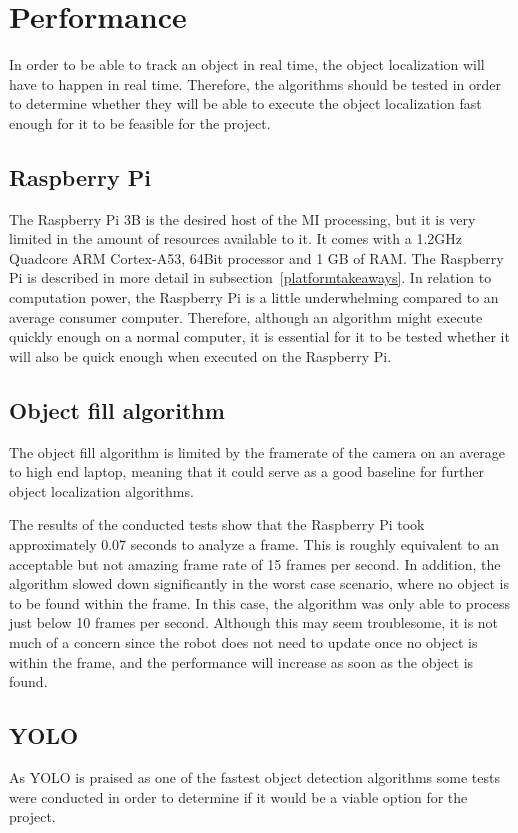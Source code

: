 \section{Performance}
In order to be able to track an object in real time, the object localization will have to happen in real time.
Therefore, the algorithms should be tested in order to determine whether they will be able to execute the object localization fast enough for it to be feasible for the project.

\subsection{Raspberry Pi}
The Raspberry Pi 3B is the desired host of the MI processing, but it is very limited in the amount of resources available to it.
It comes with a 1.2GHz Quadcore ARM Cortex-A53, 64Bit processor and 1 GB of RAM.
The Raspberry Pi is described in more detail in subsection~\ref{platformtakeaways}.
In relation to computation power, the Raspberry Pi is a little underwhelming compared to an average consumer computer.
Therefore, although an algorithm might execute quickly enough on a normal computer, it is essential for it to be tested whether it will also be quick enough when executed on the Raspberry Pi.

\subsection{Object fill algorithm}
The object fill algorithm is limited by the framerate of the camera on an average to high end laptop, meaning that it could serve as a good baseline for further object localization algorithms.

The results of the conducted tests show that the Raspberry Pi took approximately 0.07 seconds to analyze a frame.
This is roughly equivalent to an acceptable but not amazing frame rate of 15 frames per second.
In addition, the algorithm slowed down significantly in the worst case scenario, where no object is to be found within the frame.
In this case, the algorithm was only able to process just below 10 frames per second.
Although this may seem troublesome, it is not much of a concern since the robot does not need to update once no object is within the frame, and the performance will increase as soon as the object is found.

\subsection{YOLO}
As YOLO is praised as one of the fastest object detection algorithms some tests were conducted in order to determine if it would be a viable option for the project\cite{yolospeed}.

